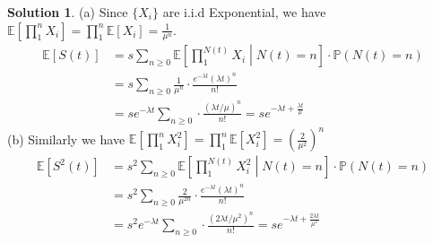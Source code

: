 \documentclass[a4paper, 10pt]{article}
\theoremstyle{definition}
\theoremstyle{hSol}
\newtheorem*{solution}{Solution}
\begin{document}
\begin{solution} (a) Since $\{X_i\}$ are i.i.d Exponential, we have $\mathbb{E}\left[\prod_{1}^n X_i\right]=\prod_1^n \mathbb{E}\left[X_i\right]=\frac{1}{\mu^n}$.
\begin{equation}
  \begin{split}
    \mathbb{E}\left[S(t)\right] &= s \sum_{n\geq 0}\mathbb{E}\left[\prod_{1}^{N(t)} X_i \middle|N(t)=n\right] \cdot \mathbb{P}\left(N(t)=n\right)\\
    &= s \sum_{n\geq 0}\frac{1}{\mu^n} \cdot \frac{e^{-\lambda t}(\lambda t)^n}{n!}\\
    &= se^{-\lambda t} \sum_{n\geq 0}\cdot \frac{(\lambda t/\mu)^n}{n!} = se^{-\lambda t+\frac{\lambda t}{\mu}}
  \end{split}
\end{equation}
(b) Similarly we have $\mathbb{E}\left[\prod_{1}^n X_i^2\right]=\prod_1^n \mathbb{E}\left[X_i^2\right]=\left(\frac{2}{\mu^2}\right)^n$
\begin{equation}
  \begin{split}
    \mathbb{E}\left[S^2(t)\right] &= s^2 \sum_{n\geq 0}\mathbb{E}\left[\prod_{1}^{N(t)} X_i^2 \middle|N(t)=n\right] \cdot \mathbb{P}\left(N(t)=n\right)\\
    &= s^2 \sum_{n\geq 0}\frac{2}{\mu^{2n}} \cdot \frac{e^{-\lambda t}(\lambda t)^n}{n!}\\
    &= s^2e^{-\lambda t} \sum_{n\geq 0}\cdot \frac{(2\lambda t/\mu^2)^n}{n!} = se^{-\lambda t+\frac{2\lambda t}{\mu^2}}
  \end{split}
\end{equation}
\end{solution}
\end{document}
